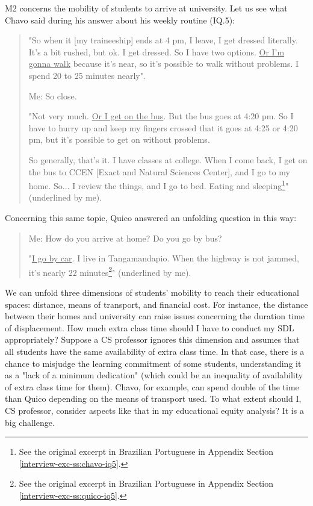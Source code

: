\gls{M}2 concerns the mobility of students to arrive at university. Let us see what Chavo said during his answer about his weekly routine (\gls{IQ}.5):
\begin{quote}
    "So when it [my traineeship] ends at 4 pm, I leave, I get dressed literally. It's a bit rushed, but ok. I get dressed. So I have two options. \underline{Or I'm gonna walk} because it's near, so it's possible to walk without problems. I spend 20 to 25 minutes nearly". 

    \colorbox{black!15}{Me: So close.}
    
    "Not very much. \underline{Or I get on the bus}. But the bus goes at 4:20 pm. So I have to hurry up and keep my fingers crossed that it goes at 4:25 or 4:20 pm, but it's possible to get on without problems.
    
    So generally, that’s it. I have classes at college. When I come back, I get on the bus to CCEN [Exact and Natural Sciences Center], and I go to my home. So... I review the things, and I go to bed. Eating and sleeping\footnote{See the original excerpt in Brazilian Portuguese in Appendix Section \ref{interview-exc-ss:chavo-iq5}.}" (underlined by me).
\end{quote}
Concerning this same topic, Quico answered an unfolding question in this way:
\begin{quote}
    \colorbox{black!15}{Me: How do you arrive at home? Do you go by bus?}

    "\underline{I go by car}. I live in Tangamandapio. When the highway is not jammed, it's nearly 22 minutes\footnote{See the original excerpt in Brazilian Portuguese in Appendix Section \ref{interview-exc-ss:quico-iq5}.}" (underlined by me).
\end{quote}

We can unfold three dimensions of students' mobility to reach their educational spaces: distance, means of transport, and financial cost. For instance, the distance between their homes and university can raise issues concerning the duration time of displacement. How much extra class time should I have to conduct my \gls{SDL} appropriately? Suppose a \gls{CS} professor ignores this dimension and assumes that all students have the same availability of extra class time. In that case, there is a chance to misjudge the learning commitment of some students, understanding it as a "lack of a minimum dedication" (which could be an inequality of availability of extra class time for them). Chavo, for example, can spend double of the time than Quico depending on the means of transport used. To what extent should I, \gls{CS} professor, consider aspects like that in my educational equity analysis? It is a big challenge.

